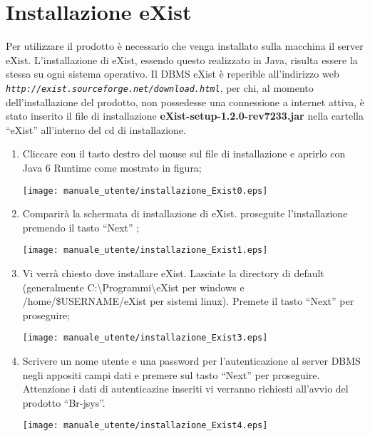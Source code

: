 \section{Installazione eXist}
Per utilizzare il prodotto \`e necessario che venga installato sulla macchina il server eXist. L'installazione di eXist, essendo questo realizzato in Java, risulta essere la stessa su ogni sistema operativo.
Il DBMS eXist \`e reperible all'indirizzo web \textit{\texttt{http://exist.sourceforge.net/download.html}}, per chi, al momento dell'installazione del prodotto, non possedesse una connessione a internet attiva, \`e stato inserito il file di installazione \textbf{eXist-setup-1.2.0-rev7233.jar} nella cartella ``eXist'' all'interno del cd di installazione.
\begin{enumerate}
\item Cliccare con il tasto destro del mouse sul file di installazione e aprirlo con Java 6 Runtime come mostrato in figura;
\begin{center}
\texttt{[image: manuale\_utente/installazione\_Exist0.eps]}\\
\end{center}
\item Comparir\`a la schermata di installazione di eXist. proseguite l'installazione premendo il tasto ``Next'' ;
\begin{center}
\texttt{[image: manuale\_utente/installazione\_Exist1.eps]}\\
\end{center}
\item Vi verr\`a chiesto dove installare eXist. Lasciate la directory di default (generalmente C:\textbackslash Programmi\textbackslash eXist per windows e  /home/\$USERNAME/eXist per sistemi linux). Premete il tasto ``Next'' per proseguire;
\begin{center}
\texttt{[image: manuale\_utente/installazione\_Exist3.eps]}\\
\end{center}
\item Scrivere un nome utente e una password per l'autenticazione al server DBMS negli appositi campi dati e premere sul tasto ``Next'' per proseguire. Attenzione i dati di autenticazine inseriti vi verranno richiesti all'avvio del prodotto ``Br-jsys''.
\begin{center}
\texttt{[image: manuale\_utente/installazione\_Exist4.eps]}\\
\end{center}

\end{enumerate}
